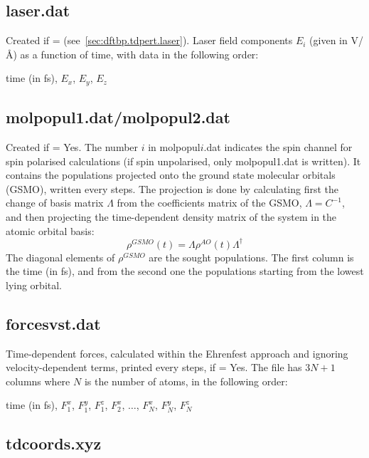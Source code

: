 \subsection{laser.dat}

Created if  = 
(see~\ref{sec:dftbp.tdpert.laser}). Laser field components $E_i$ (given in
V/\AA) as a function of time, with data in the following order:

time (in fs), $E_x$, $E_y$, $E_z$

\subsection{molpopul1.dat/molpopul2.dat}

Created if  = Yes. The number $i$ in molpopul$i$.dat
indicates the spin channel for spin polarised calculations (if spin
unpolarised, only molpopul1.dat is written). It contains the
populations projected onto the ground state molecular orbitals (GSMO),
written every  steps. The projection is done by
calculating first the change of basis matrix $\Lambda$ from the
coefficients matrix of the GSMO, $\Lambda = C^{-1}$, and then
projecting the time-dependent density matrix of the system in the
atomic orbital basis:
\begin{equation*}
  \rho^{GSMO}(t) = \Lambda \rho^{AO}(t) \Lambda^{\dagger}
\end{equation*}
The diagonal elements of $\rho^{GSMO}$ are the sought populations. The first
column is the time (in fs), and from the second one the populations starting
from the lowest lying orbital.

\subsection{forcesvst.dat}

Time-dependent forces, calculated within the Ehrenfest approach and
ignoring velocity-dependent terms, printed every 
steps, if  = Yes. The file has $3N +1$ columns where $N$ is
the number of atoms, in the following order:

time (in fs), $F_1^x$, $F_1^y$, $F_1^z$, $F_2^x$, $\dots$, $F_N^x$,
$F_N^y$, $F_N^z$

\subsection{tdcoords.xyz}


